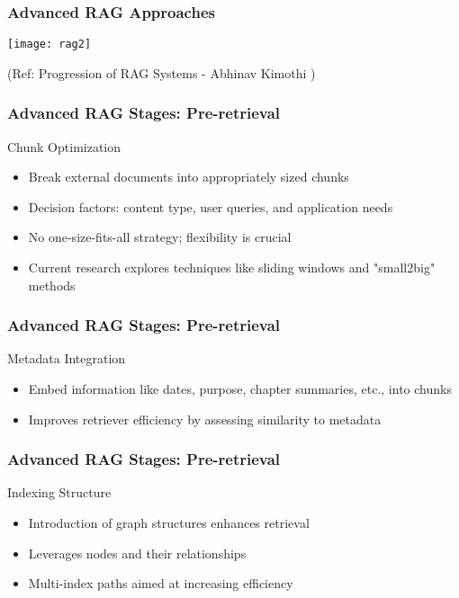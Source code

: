 \begin{frame}[fragile]\frametitle{Advanced RAG Approaches}

\begin{center}
\texttt{[image: rag2]}

{\tiny (Ref: Progression of RAG Systems - Abhinav Kimothi )}
\end{center}	
\end{frame}


\begin{frame}[fragile]\frametitle{Advanced RAG Stages: Pre-retrieval}
Chunk Optimization

  \begin{itemize}
    \item Break external documents into appropriately sized chunks
    \item Decision factors: content type, user queries, and application needs
    \item No one-size-fits-all strategy; flexibility is crucial
    \item Current research explores techniques like sliding windows and "small2big" methods
  \end{itemize}
\end{frame}

\begin{frame}[fragile]\frametitle{Advanced RAG Stages: Pre-retrieval}
Metadata Integration

  \begin{itemize}
    \item Embed information like dates, purpose, chapter summaries, etc., into chunks
    \item Improves retriever efficiency by assessing similarity to metadata
  \end{itemize}
\end{frame}

\begin{frame}[fragile]\frametitle{Advanced RAG Stages: Pre-retrieval}
Indexing Structure
  \begin{itemize}
    \item Introduction of graph structures enhances retrieval
    \item Leverages nodes and their relationships
    \item Multi-index paths aimed at increasing efficiency
  \end{itemize}
\end{frame}

